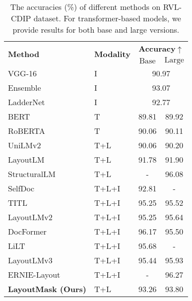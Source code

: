 \documentclass[11pt]{article}
\begin{document}
\begin{table}[]
\centering
\scriptsize
\begin{tabular}{l|l|cc}
\hline
\multirow{2}{*}{\textbf{Method}} & \multirow{2}{*}{\textbf{Modality}} & \multicolumn{2}{c}{\textbf{Accuracy$\uparrow$}}       \\ \cline{3-4} 
                        &                           & \multicolumn{1}{c|}{$\mathrm{Base}$}  &$\mathrm{Large}$\\ \hline
VGG-16 \citep{afzal2017cutting}                 & I                         & \multicolumn{2}{c}{90.97}          \\
Ensemble    \citep{das2018document}           & I                         & \multicolumn{2}{c}{93.07}   \\ 
LadderNet   \citep{sarkhel2019deterministic}            & I                         & \multicolumn{2}{c}{92.77}          \\ \hline
BERT     \citep{kenton2019bert}                 & T                         & \multicolumn{1}{c|}{89.81} & 89.92 \\
RoBERTA      \citep{liu2019roberta}               & T                         & \multicolumn{1}{c|}{90.06} & 90.11 \\ \hline
UniLMv2      \citep{bao2020unilmv2}              & T+L                       & \multicolumn{1}{c|}{90.06} & 90.20 \\
LayoutLM  \citep{xu2020layoutlm}               & T+L                       & \multicolumn{1}{c|}{91.78} & 91.90 \\
StructuralLM     \citep{li2021structurallm}       & T+L                       & \multicolumn{1}{c|}{-}     & 96.08 \\ \hline
SelfDoc   \citep{li2021selfdoc}              & T+L+I                     & \multicolumn{1}{c|}{92.81} & -     \\
TITL       \citep{powalski2021going}                  & T+L+I                     & \multicolumn{1}{c|}{95.25} & 95.52 \\
LayoutLMv2   \citep{xu2021layoutlmv2}           & T+L+I                     & \multicolumn{1}{c|}{95.25} & 95.64 \\
DocFormer  \citep{appalaraju2021docformer}               & T+L+I                     & \multicolumn{1}{c|}{96.17} & 95.50 \\
LiLT      \citep{wang2022lilt}                 & T+L+I                     & \multicolumn{1}{c|}{95.68} & -     \\
LayoutLMv3 \citep{huang2022layoutlmv3}                & T+L+I                     & \multicolumn{1}{c|}{95.44} & 95.93 \\
ERNIE-Layout      \citep{peng2022ernie}       & T+L+I                     & \multicolumn{1}{c|}{-}     & 96.27 \\ \hline
\textbf{LayoutMask (Ours)}              & T+L                       & \multicolumn{1}{c|}{93.26} & 93.80 \\ \hline
\end{tabular}
\caption{\label{table:rvlcdip-sota}
The accuracies (\%) of different methods on RVL-CDIP dataset. For transformer-based models, we provide results for both base and large versions.}
\end{table}
\end{document}
